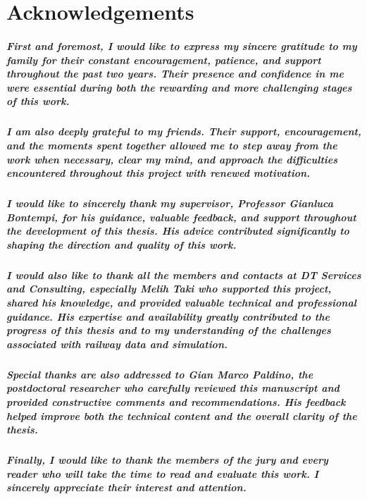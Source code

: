 \chapter*{Acknowledgements}

\paragraph{First and foremost, I would like to express my sincere gratitude to my family for their constant encouragement, 
patience, and support throughout the past two years. Their presence and confidence in me were essential during both the 
rewarding and more challenging stages of this work.}

\paragraph{I am also deeply grateful to my friends. Their support, encouragement, and the moments spent together allowed 
me to step away from the work when necessary, clear my mind, and approach the difficulties encountered throughout this 
project with renewed motivation.}

\paragraph{I would like to sincerely thank my supervisor, Professor Gianluca Bontempi, for his guidance, valuable 
feedback, and support throughout the development of this thesis. His advice contributed significantly to shaping the 
direction and quality of this work.}

\paragraph{I would also like to thank all the members and contacts at DT Services and Consulting, especially Melih Taki 
who supported this project, shared his knowledge, and provided valuable technical and professional guidance. His 
expertise and availability greatly contributed to the progress of this thesis and to my understanding of the challenges 
associated with railway data and simulation.}

\paragraph{Special thanks are also addressed to Gian Marco Paldino, the postdoctoral researcher who carefully reviewed 
this manuscript and provided constructive comments and recommendations. His feedback helped improve both the technical 
content and the overall clarity of the thesis.}

\paragraph{Finally, I would like to thank the members of the jury and every reader who will take the time to read and 
evaluate this work. I sincerely appreciate their interest and attention.}